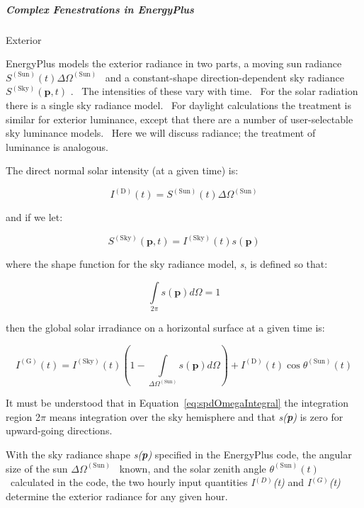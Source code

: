 \subparagraph{Complex Fenestrations in EnergyPlus}\label{complex-fenestrations-in-energyplus}

Exterior

EnergyPlus models the exterior radiance in two parts, a moving sun radiance \({S^{{\mathrm{(Sun)}}}}(t)\Delta {\Omega ^{{\mathrm{(Sun)}}}}\) ~and a constant-shape direction-dependent sky radiance \({S^{{\mathrm{(Sky)}}}}({\mathbf{p}},t)\) .~ The intensities of these vary with time.~ For the solar radiation there is a single sky radiance model.~ For daylight calculations the treatment is similar for exterior luminance, except that there are a number of user-selectable sky luminance models.~ Here we will discuss radiance; the treatment of luminance is analogous.

The direct normal solar intensity (at a given time) is:

\begin{equation}
{I^{{\mathrm{(D)}}}}(t) = {S^{{\mathrm{(Sun)}}}}(t)\Delta {\Omega ^{{\mathrm{(Sun)}}}}
\end{equation}

and if we let:

\begin{equation}
{S^{{\mathrm{(Sky)}}}}({\mathbf{p}},t) = {I^{{\mathrm{(Sky)}}}}(t)s({\mathbf{p}})
\end{equation}

where the shape function for the sky radiance model, \emph{s}, is defined so that:

\begin{equation}
\int\limits_{2\pi } {s({\mathbf{p}})d\Omega }  = 1
\label{eq:spdOmegaIntegral}
\end{equation}

then the global solar irradiance on a horizontal surface at a given time is:

\begin{equation}
{I^{{\mathrm{(G)}}}}(t) = {I^{{\mathrm{(Sky)}}}}(t)\left( {1 - \int\limits_{\Delta {\Omega ^{{\mathrm{(Sun)}}}}} {s({\mathbf{p}})d\Omega } } \right) + {I^{{\mathrm{(D)}}}}(t)\cos {\theta ^{{\mathrm{(Sun)}}}}(t)
\end{equation}

It must be understood that in Equation~\ref{eq:spdOmegaIntegral} the integration region 2\(\pi\) means integration over the sky hemisphere and that \emph{s(\textbf{p})} is zero for upward-going directions.

With the sky radiance shape \emph{s(\textbf{p})} specified in the EnergyPlus code, the angular size of the sun \(\Delta {\Omega ^{{\mathrm{(Sun)}}}}\) ~known, and the solar zenith angle \({\theta ^{{\mathrm{(Sun)}}}}(t)\) ~calculated in the code, the two hourly input quantities \emph{I}\(^{(D)}\)\emph{(t)} and \emph{I}\(^{(G)}\)\emph{(t)} determine the exterior radiance for any given hour.

